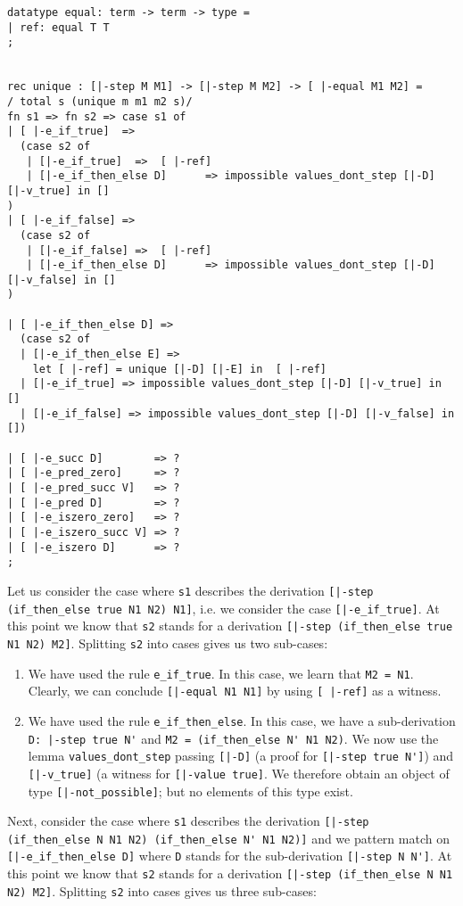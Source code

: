 \begin{lstlisting}
datatype equal: term -> term -> type =
| ref: equal T T
;


rec unique : [|-step M M1] -> [|-step M M2] -> [ |-equal M1 M2] =
/ total s (unique m m1 m2 s)/
fn s1 => fn s2 => case s1 of
| [ |-e_if_true]  =>
  (case s2 of
   | [|-e_if_true]  =>  [ |-ref]
   | [|-e_if_then_else D]      => impossible values_dont_step [|-D] [|-v_true] in []
)
| [ |-e_if_false] =>
  (case s2 of
   | [|-e_if_false] =>  [ |-ref]
   | [|-e_if_then_else D]      => impossible values_dont_step [|-D] [|-v_false] in []
)

| [ |-e_if_then_else D] =>
  (case s2 of
  | [|-e_if_then_else E] =>
    let [ |-ref] = unique [|-D] [|-E] in  [ |-ref]
  | [|-e_if_true] => impossible values_dont_step [|-D] [|-v_true] in []
  | [|-e_if_false] => impossible values_dont_step [|-D] [|-v_false] in [])

| [ |-e_succ D]        => ?
| [ |-e_pred_zero]     => ?
| [ |-e_pred_succ V]   => ?
| [ |-e_pred D]        => ?
| [ |-e_iszero_zero]   => ?
| [ |-e_iszero_succ V] => ?
| [ |-e_iszero D]      => ?
;
\end{lstlisting}

Let us consider the case where \lstinline!s1! describes the derivation
\lstinline![|-step (if_then_else true N1 N2) N1]!, i.e. we consider the case
\lstinline![|-e_if_true]!. At this point we know that \lstinline!s2! stands
for a derivation \lstinline![|-step (if_then_else true N1 N2) M2]!. Splitting
\lstinline!s2! into cases gives us two sub-cases:
\begin{enumerate}
\item We have used the rule
\lstinline!e_if_true!. In this case, we learn that
\lstinline!M2 = N1!. Clearly, we can conclude \lstinline![|-equal N1 N1]! by
using \lstinline![ |-ref]! as a witness.

\item We have used the rule \lstinline!e_if_then_else!. In this case, we have a
  sub-derivation \lstinline!D: |-step true N'! and \lstinline!M2 = (if_then_else N' N1 N2)!.
We now use the lemma \lstinline!values_dont_step! passing \lstinline![|-D]! (a
proof for \lstinline![|-step true N']!) and \lstinline![|-v_true]! (a witness
for \lstinline![|-value true]!.
We therefore obtain an object of type \lstinline![|-not_possible]!; but no
elements of this type exist.
\end{enumerate}

Next, consider the case where \lstinline!s1! describes the derivation
\lstinline![|-step (if_then_else N N1 N2) (if_then_else N' N1 N2)]! and we pattern match on
\lstinline![|-e_if_then_else D]! where \lstinline!D! stands for the sub-derivation
\lstinline![|-step N N']!. At this point we know that \lstinline!s2! stands
for a derivation \lstinline![|-step (if_then_else N N1 N2) M2]!. Splitting
\lstinline!s2! into cases gives us three sub-cases:

